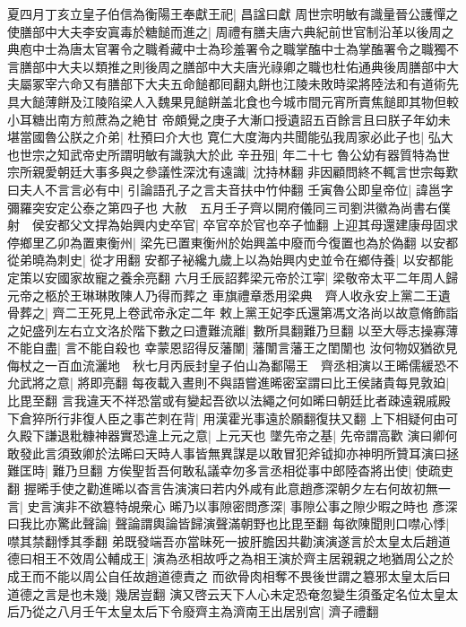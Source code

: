 夏四月丁亥立皇子伯信為衡陽王奉獻王祀|{
	昌諡曰獻}
周世宗明敏有識量晉公護憚之使膳部中大夫李安寘毒於糖䭔而進之|{
	周禮有膳夫唐六典紀前世官制沿革以後周之典庖中士為唐太官署令之職肴藏中士為珍羞署令之職掌醢中士為掌醢署令之職獨不言膳部中大夫以類推之則後周之膳部中大夫唐光祿卿之職也杜佑通典後周膳部中大夫屬冢宰六命又有膳部下大夫五命䭔都囘翻丸餅也江陵未敗時梁將陸法和有道術先具大䭔薄餅及江陵陷梁人入魏果見䭔餅盖北食也今城市間元宵所賣焦䭔即其物但較小耳糖出南方煎蔗為之絶甘}
帝頗覺之庚子大漸口授遺詔五百餘言且曰朕子年幼未堪當國魯公朕之介弟|{
	杜預曰介大也}
寛仁大度海内共聞能弘我周家必此子也|{
	弘大也世宗之知武帝史所謂明敏有識孰大於此}
辛丑殂|{
	年二十七}
魯公幼有器質特為世宗所親愛朝廷大事多與之參議性深沈有遠識|{
	沈持林翻}
非因顧問終不輒言世宗每歎曰夫人不言言必有中|{
	引論語孔子之言夫音扶中竹仲翻}
壬寅魯公即皇帝位|{
	諱邕字彌羅突安定公泰之第四子也}
大赦　五月壬子齊以開府儀同三司劉洪徽為尚書右僕射　侯安都父文捍為始興内史卒官|{
	卒官卒於官也卒子恤翻}
上迎其母還建康母固求停鄉里乙卯為置東衡州|{
	梁先已置東衡州於始興盖中廢而今復置也為於偽翻}
以安都從弟曉為刺史|{
	從才用翻}
安都子袐纔九歲上以為始興内史並令在鄉侍養|{
	以安都能定策以安國家故寵之養余亮翻}
六月壬辰詔葬梁元帝於江寜|{
	梁敬帝太平二年周人歸元帝之柩於王琳琳敗陳人乃得而葬之}
車旗禮章悉用梁典　齊人收永安上黨二王遺骨葬之|{
	齊二王死見上卷武帝永定二年}
敕上黨王妃李氏還第馮文洛尚以故意脩飾詣之妃盛列左右立文洛於階下數之曰遭難流離|{
	數所具翻難乃旦翻}
以至大辱志操寡薄不能自盡|{
	言不能自殺也}
幸蒙恩詔得反藩闈|{
	藩闈言藩王之閨闈也}
汝何物奴猶欲見侮杖之一百血流灑地　秋七月丙辰封皇子伯山為鄱陽王　齊丞相演以王晞儒緩恐不允武將之意|{
	將即亮翻}
每夜載入晝則不與語嘗進晞密室謂曰比王侯諸貴每見敦廹|{
	比毘至翻}
言我違天不祥恐當或有變起吾欲以法繩之何如晞曰朝廷比者疎遠親戚殿下倉猝所行非復人臣之事芒刺在背|{
	用漢霍光事遠於願翻復扶又翻}
上下相疑何由可久殿下謙退粃糠神器實恐違上元之意|{
	上元天也}
墜先帝之基|{
	先帝謂高歡}
演曰卿何敢發此言須致卿於法晞曰天時人事皆無異謀是以敢冒犯斧钺抑亦神明所贊耳演曰拯難匡時|{
	難乃旦翻}
方俟聖哲吾何敢私議幸勿多言丞相從事中郎陸杳將出使|{
	使疏吏翻}
握晞手使之勸進晞以杳言告演演曰若内外咸有此意趙彥深朝夕左右何故初無一言|{
	史言演非不欲簒特覘衆心}
晞乃以事隙密問彥深|{
	事隙公事之隙少暇之時也}
彥深曰我比亦驚此聲論|{
	聲論謂輿論皆歸演聲滿朝野也比毘至翻}
每欲陳聞則口噤心悸|{
	噤其禁翻悸其季翻}
弟既發端吾亦當昧死一披肝膽因共勸演演遂言於太皇太后趙道德曰相王不效周公輔成王|{
	演為丞相故呼之為相王演於齊主居親親之地猶周公之於成王而不能以周公自任故趙道德責之}
而欲骨肉相奪不畏後世謂之簒邪太皇太后曰道德之言是也未幾|{
	幾居豈翻}
演又啓云天下人心未定恐奄忽變生須蚤定名位太皇太后乃從之八月壬午太皇太后下令廢齊主為濟南王出居别宫|{
	濟子禮翻}
